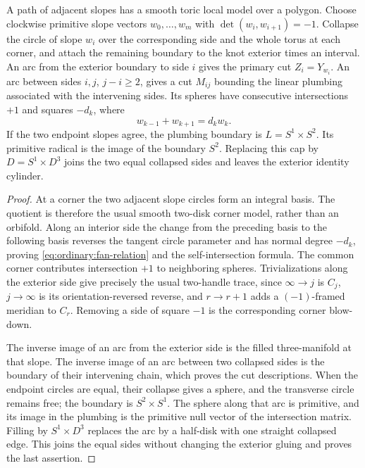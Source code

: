\begin{lemma}\label{lem:ordinary:polygon}
A path of adjacent slopes has a smooth toric local model over a polygon.
Choose clockwise primitive slope vectors $w_0,\ldots,w_m$ with
$\det(w_i,w_{i+1})=-1$.  Collapse the circle of slope $w_i$ over the
corresponding side and the whole torus at each corner, and attach the
remaining boundary to the knot exterior times an interval.  An arc
from the exterior boundary to side $i$ gives the primary cut
$Z_i=Y_{w_i}$.  An arc between sides $i,j$, $j-i\ge2$, gives a cut
$M_{ij}$ bounding the linear plumbing associated with the intervening
sides.  Its spheres have consecutive intersections $+1$ and squares
$-d_k$, where
\begin{equation}\label{eq:ordinary:fan-relation}
 w_{k-1}+w_{k+1}=d_kw_k.
\end{equation}
If the two endpoint slopes agree, the plumbing boundary is
$L=S^1\times S^2$.  Its primitive radical is the image of the boundary
$S^2$.  Replacing this cap by $D=S^1\times D^3$ joins the two equal
collapsed sides and leaves the exterior identity cylinder.
\end{lemma}
\begin{proof}
At a corner the two adjacent slope circles form an integral basis.
The quotient is therefore the usual smooth two-disk corner model,
rather than an orbifold.  Along an interior side the change from
the preceding basis to the following basis reverses the tangent
circle parameter and has normal degree $-d_k$, proving
\eqref{eq:ordinary:fan-relation} and the self-intersection formula.
The common corner contributes intersection $+1$ to neighboring
spheres.  Trivializations along the exterior side give precisely
the usual two-handle trace, since $\infty\to j$ is $C_j$,
$j\to\infty$ is its orientation-reversed reverse, and
$r\to r+1$ adds a $(-1)$-framed meridian to $C_r$.  Removing a
side of square $-1$ is the corresponding corner blow-down.

The inverse image of an arc from the exterior side is the filled
three-manifold at that slope.  The inverse image of an arc between
two collapsed sides is the boundary of their intervening chain,
which proves the cut descriptions.  When the endpoint circles
are equal, their collapse gives a sphere, and the transverse
circle remains free; the boundary is $S^2\times S^1$.
The sphere along that arc is primitive, and its image in the
plumbing is the primitive null vector of the intersection
matrix.  Filling by $S^1\times D^3$ replaces the arc by a
half-disk with one straight collapsed edge.  This joins the equal
sides without changing the exterior gluing and proves the last
assertion.
\end{proof}

